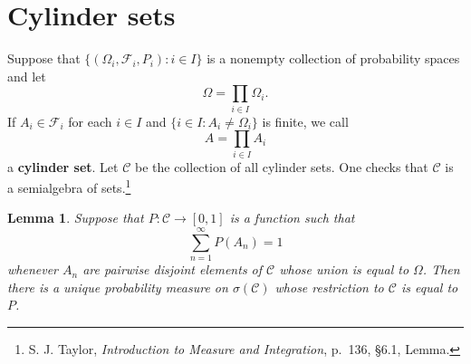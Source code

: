 \documentclass{article}
\newtheorem{lemma}[theorem]{Lemma}
\theoremstyle{definition}
\begin{document}
\section{Cylinder sets}
Suppose that $\{(\Omega_i,\mathscr{F}_i,P_i): i \in I\}$ is a nonempty collection of probability spaces and let
\[
\Omega = \prod_{i \in I} \Omega_i.
\]
If $A_i \in \mathscr{F}_i$ for each $i \in I$ and $\{i \in I: A_i \neq \Omega_i\}$ is finite,
we call
\[
A = \prod_{i \in I} A_i
\]
a \textbf{cylinder set}. Let $\mathscr{C}$ be the collection of all cylinder sets. 
One checks that $\mathscr{C}$ is a semialgebra of sets.\footnote{S. J. Taylor, {\em Introduction to Measure and Integration},
p.~136, \S 6.1, Lemma.}



\begin{lemma}
Suppose that $P:\mathscr{C} \to [0,1]$ is a function such that 
\[
\sum_{n=1}^\infty P(A_n)=1
\]
whenever $A_n$ are pairwise disjoint elements of $\mathscr{C}$ whose union is equal to $\Omega$. Then there is a unique probability measure
on $\sigma(\mathscr{C})$ whose restriction to $\mathscr{C}$ is equal to $P$. 
\label{cylinderextension}
\end{lemma}
\end{document}
